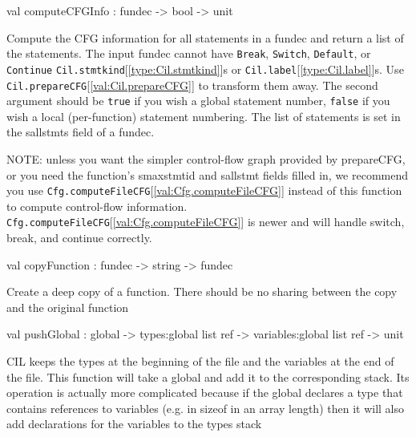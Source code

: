 \documentclass[11pt]{article}
\begin{document}
\label{val:Cil.computeCFGInfo}\begin{ocamldoccode}
val computeCFGInfo : fundec -> bool -> unit
\end{ocamldoccode}
\begin{ocamldocdescription}
Compute the CFG information for all statements in a fundec and return a 
 list of the statements. The input fundec cannot have {\tt{Break}}, {\tt{Switch}}, 
 {\tt{Default}}, or {\tt{Continue}} {\tt{Cil.stmtkind}}[\ref{type:Cil.stmtkind}]s or {\tt{Cil.label}}[\ref{type:Cil.label}]s. Use
 {\tt{Cil.prepareCFG}}[\ref{val:Cil.prepareCFG}] to transform them away.  The second argument should
 be {\tt{true}} if you wish a global statement number, {\tt{false}} if you wish a
 local (per-function) statement numbering. The list of statements is set 
 in the sallstmts field of a fundec. 


 NOTE: unless you want the simpler control-flow graph provided by
 prepareCFG, or you need the function's smaxstmtid and sallstmt fields
 filled in, we recommend you use {\tt{Cfg.computeFileCFG}}[\ref{val:Cfg.computeFileCFG}] instead of this
 function to compute control-flow information.
 {\tt{Cfg.computeFileCFG}}[\ref{val:Cfg.computeFileCFG}] is newer and will handle switch, break, and
 continue correctly.


\end{ocamldocdescription}




\label{val:Cil.copyFunction}\begin{ocamldoccode}
val copyFunction : fundec -> string -> fundec
\end{ocamldoccode}
\begin{ocamldocdescription}
Create a deep copy of a function. There should be no sharing between the 
 copy and the original function


\end{ocamldocdescription}




\label{val:Cil.pushGlobal}\begin{ocamldoccode}
val pushGlobal :
  global ->
  types:global list ref ->
  variables:global list ref -> unit
\end{ocamldoccode}
\begin{ocamldocdescription}
CIL keeps the types at the beginning of the file and the variables at the 
 end of the file. This function will take a global and add it to the 
 corresponding stack. Its operation is actually more complicated because if 
 the global declares a type that contains references to variables (e.g. in 
 sizeof in an array length) then it will also add declarations for the 
 variables to the types stack


\end{ocamldocdescription}
\end{document}
